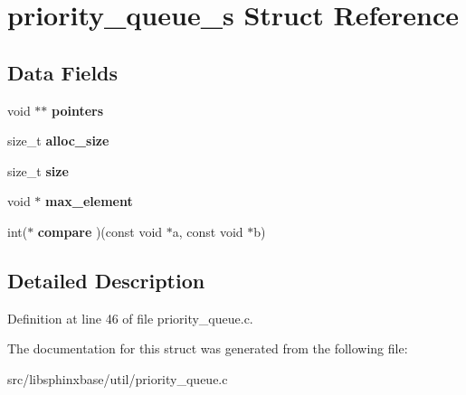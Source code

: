 \section{priority\-\_\-queue\-\_\-s Struct Reference}
\label{structpriority__queue__s}
\subsection*{Data Fields}
\begin{DoxyCompactItemize}
\item 
void $\ast$$\ast$ {\bfseries pointers}\label{structpriority__queue__s_a2d83272d62f250d2f685f500d7b5a865}

\item 
size\-\_\-t {\bfseries alloc\-\_\-size}\label{structpriority__queue__s_ae97c85552234938ef5bf84d2bbd06f75}

\item 
size\-\_\-t {\bfseries size}\label{structpriority__queue__s_a797e9b9767bae286b06d5b57e9f4a11a}

\item 
void $\ast$ {\bfseries max\-\_\-element}\label{structpriority__queue__s_a805c395ea39df723cf6d6d9468f2a05e}

\item 
int($\ast$ {\bfseries compare} )(const void $\ast$a, const void $\ast$b)\label{structpriority__queue__s_a1c668f489d695ba016090b95a6a1b05a}

\end{DoxyCompactItemize}


\subsection{Detailed Description}


Definition at line 46 of file priority\-\_\-queue.\-c.



The documentation for this struct was generated from the following file\-:\begin{DoxyCompactItemize}
\item 
src/libsphinxbase/util/priority\-\_\-queue.\-c\end{DoxyCompactItemize}
